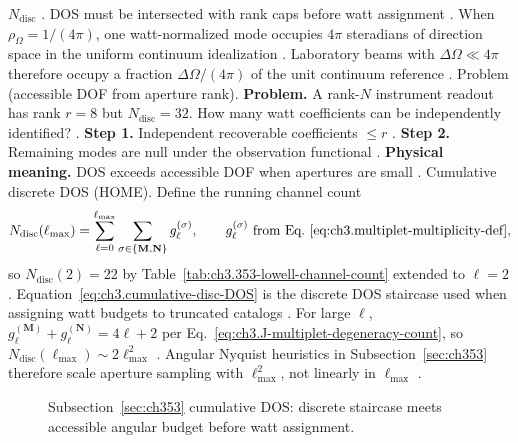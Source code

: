 \(N_{\mathrm{disc}}\) \cite{harrington2001}. DOS must be intersected with rank caps before watt assignment
\cite{harrington2001}.
When \(\rho_{\Omega}=1/(4\pi)\), one watt-normalized mode occupies \(4\pi\) steradians of direction space in the uniform
continuum idealization \cite{jackson1999}. Laboratory beams with \(\Delta\Omega\ll4\pi\) therefore occupy a
fraction \(\Delta\Omega/(4\pi)\) of the unit continuum reference \cite{harrington2001}.
Problem (accessible DOF from aperture rank). \textbf{Problem.} A rank-$N$ instrument readout has rank \(r=8\) but \(N_{\mathrm{disc}}=32\). How many watt coefficients can be
independently identified? \cite{harrington2001}.
\textbf{Step 1.} Independent recoverable coefficients \(\le r\) \cite{harrington2001}.
\textbf{Step 2.} Remaining modes are null under the observation functional \cite{stratton1941}.
\textbf{Physical meaning.} DOS exceeds accessible DOF when apertures are small \cite{harrington2001}.
Cumulative discrete DOS (HOME). Define the running channel count
\begin{equation}
\label{eq:ch3.cumulative-disc-DOS}
N_{\mathrm{disc}}(\ell_{\max})
=
\sum_{\ell=0}^{\ell_{\max}}\sum_{\sigma\in\{\mathbf{M},\mathbf{N}\}} g_{\ell}^{(\sigma)},
\qquad
g_{\ell}^{(\sigma)}\ \text{from Eq.~\eqref{eq:ch3.multiplet-multiplicity-def}},
\end{equation}
so \(N_{\mathrm{disc}}(2)=22\) by Table~\ref{tab:ch3.353-lowell-channel-count} extended to \(\ell=2\)
\cite{jackson1999}. Equation~\eqref{eq:ch3.cumulative-disc-DOS} is the discrete DOS staircase used when
assigning watt budgets to truncated catalogs \cite{harrington2001}.
For large \(\ell\), \(g_{\ell}^{(\mathbf{M})}+g_{\ell}^{(\mathbf{N})}=4\ell+2\) per Eq.~\eqref{eq:ch3.J-multiplet-degeneracy-count},
so \(N_{\mathrm{disc}}(\ell_{\max})\sim 2\ell_{\max}^{2}\) \cite{jackson1999}. Angular Nyquist heuristics in
Subsection~\ref{sec:ch353} therefore scale aperture sampling with \(\ell_{\max}^{2}\), not linearly in \(\ell_{\max}\)
\cite{harrington2001}.
\begin{figure}[t]
\centering
{}
\caption{Subsection~\ref{sec:ch353} cumulative DOS: discrete staircase meets accessible angular budget before watt assignment.}
\label{fig:ch3.353-cumulative-dos}
\end{figure}
